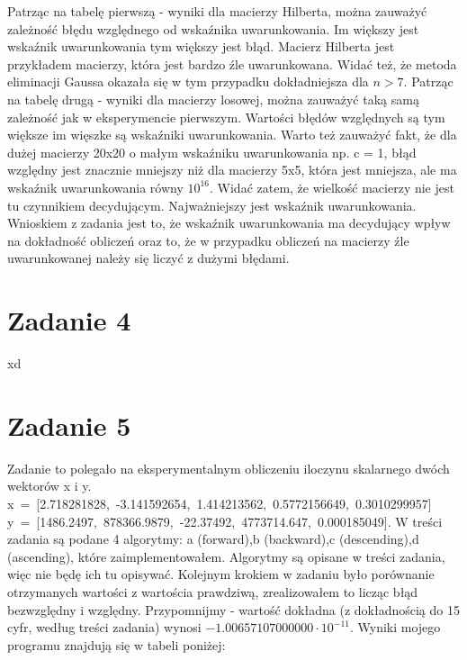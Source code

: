 \documentclass[]{article}
\begin{document}
	Patrząc na tabelę pierwszą - wyniki dla macierzy Hilberta, można zauważyć zależność błędu względnego od wskaźnika uwarunkowania. Im większy jest wskaźnik uwarunkowania tym większy jest błąd. Macierz Hilberta jest przykładem macierzy, która jest bardzo źle uwarunkowana. Widać też, że metoda eliminacji Gaussa okazała się w tym przypadku dokładniejsza dla $n>7$. \newline
	Patrząc na tabelę drugą - wyniki dla macierzy losowej, można zauważyć taką samą zależność jak w eksperymencie pierwszym. Wartości błędów względnych są tym większe im więszke są wskaźniki uwarunkowania. Warto też zauważyć fakt, że dla dużej macierzy 20x20 o małym wskaźniku uwarunkowania np. c = 1, błąd względny jest znacznie mniejszy niż dla macierzy 5x5, która jest mniejsza, ale ma wskaźnik uwarunkowania równy $10^{16}$. Widać zatem, że wielkość macierzy nie jest tu czynnikiem decydującym. Najważniejszy jest wskaźnik uwarunkowania. Wnioskiem z zadania jest to, że wskaźnik uwarunkowania ma decydujący wpływ na dokładność obliczeń oraz to, że w przypadku obliczeń na macierzy źle uwarunkowanej należy się liczyć z dużymi błędami.
	
	\section*{Zadanie 4}

	xd
	
	\section*{Zadanie 5}
	Zadanie to polegało na eksperymentalnym obliczeniu iloczynu skalarnego dwóch wektorów x i y. \newline
	\mbox{x = [2.718281828, -3.141592654, 1.414213562, 0.5772156649, 0.3010299957]}\newline
	\mbox{y = [1486.2497, 878366.9879, -22.37492, 4773714.647, 0.000185049].}\newline
	W treści zadania są podane 4 algorytmy: \newline a (forward),b (backward),c (descending),d (ascending), które zaimplementowałem. Algorytmy są opisane w treści zadania, więc nie będę ich tu opisywać. Kolejnym krokiem w zadaniu było porównanie otrzymanych wartości z wartościa prawdziwą, zrealizowałem to licząc błąd bezwzględny i względny. Przypomnijmy - wartość dokładna (z dokładnością do 15 cyfr, według treści zadania) wynosi \(-1.00657107000000\cdot10^{-11}\). Wyniki mojego programu znajdują się w tabeli poniżej:
	
\end{document}
